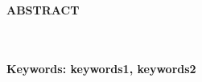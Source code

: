 \clearpage
{}%
\thispagestyle{fancy}

\begin{center}
	\large \bfseries \MakeUppercase{Abstract}\\
	\normalsize \normalfont {\thetitleEN}\\
	\normalsize \normalfont {\theauthor}\\
	\bigskip
	
	\normalsize \normalfont \justifying \singlespacing
	\lipsum[1]%
    
    \vspace{20pt}
	\raggedright\textbf{Keywords: keywords1, keywords2}
	
	\vfill
	
\end{center}
\clearpage